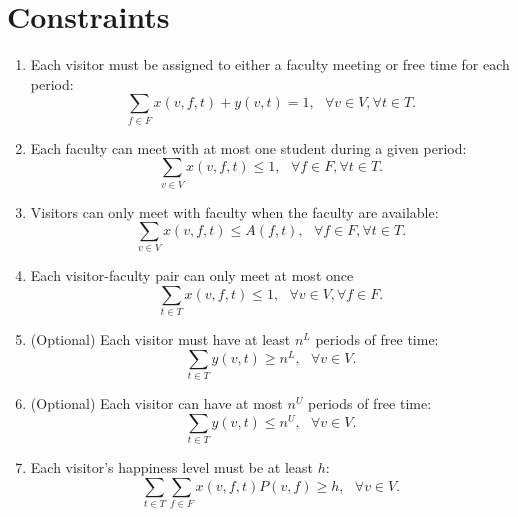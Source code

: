 \documentclass[12pt]{article}
\theoremstyle{definition}
\newtheorem{definition set}{Definition Set}%
\newtheorem{problem statement}{Problem Statement} %
\theoremstyle{remark}
\theoremstyle{remark}
\begin{document}
\section{Constraints}
\begin{enumerate}
\item
Each visitor must be assigned to either a faculty meeting or free time for each period:
\begin{equation}
\sum_{f \in F} x(v,f,t) + y(v,t) = 1, \ \ \ \forall v \in V, \forall t \in T.
\end{equation}

\item
Each faculty can meet with at most one student during a given period:
\begin{equation}
\sum_{v \in V} x(v,f,t) \leq 1, \ \ \ \forall f \in F, \forall t \in T.
\end{equation}

\item
Visitors can only meet with faculty when the faculty are available:
\begin{equation}
\sum_{v \in V} x(v,f,t) \leq A(f,t), \ \ \ \forall f \in F, \forall t \in T.
\end{equation}

\item
Each visitor-faculty pair can only meet at most once
\begin{equation}
\sum_{t \in T} x(v,f,t) \leq 1, \ \ \ \forall v \in V, \forall f \in F.
\end{equation}

\item (Optional) Each visitor must have at least $n^L$ periods of free time:
\begin{equation}
\sum_{t \in T} y(v,t) \geq n^L, \ \ \ \forall v \in V.
\end{equation}

\item (Optional) Each visitor can have at most $n^U$ periods of free time:
\begin{equation}
\sum_{t \in T} y(v,t) \leq n^U, \ \ \ \forall v \in V.
\end{equation}

\item 
Each visitor\rq{}s happiness level must be at least $h$:
\begin{equation}
\sum_{t \in T} \sum_{f \in F} x(v,f,t) P(v,f) \geq h, \ \ \ \forall v \in V.
\end{equation}
\end{enumerate}
\end{document}
